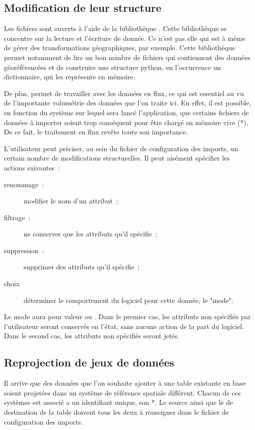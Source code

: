   \subsection{Modification de leur structure}

Les fichiers sont ouverts à l'aide de la bibliothèque . Cette bibliothèque se concentre sur la lecture et l'écriture de donnée. Ce n'est pas elle qui est à même de gérer des transformations géographiques, par exemple. Cette bibliothèque permet notamment de lire un bon nombre de fichiers qui contiennent des données géoréférencées et de construire une structure python, en l'occurrence un dictionnaire, qui les représente en mémoire.

De plus,  permet de travailler avec les données en flux, ce qui est essentiel au vu de l'importante volumétrie des données que l'on traite ici. En effet, il est possible, en fonction du système sur lequel sera lancé l'application, que certains fichiers de données à importer soient trop conséquent pour être chargé en mémoire vive (*). De ce fait, le traitement en flux revête toute son importance.

L'utilisateur peut préciser, au sein du fichier de configuration des imports, un certain nombre de modifications structurelles. Il peut aisément spécifier les actions suivantes~:

\begin{description}
  \item[renommage~:] modifier le nom d'un attribut~;
  \item[filtrage~:] ne conserver que les attributs qu'il spécifie~;
  \item[suppression~:] supprimer des attributs qu'il spécifie~;
  \item[choix] déterminer le comportement du logiciel pour cette donnée, le "mode".
\end{description}

Le mode aura pour valeur  ou . Dans le premier cas, les attributs non spécifiés par l'utilisateur seront conservés en l'état, sans aucune action de la part du logiciel. Dans le second cas, les attributs non spécifiés seront jetés.

  \subsection{Reprojection de jeux de données}

Il arrive que des données que l'on souhaite ajouter à une table existante en base soient projetées dans un système de référence spatiale différent. Chacun de ces systèmes est associé a un identifiant unique, son *. Le  source ainsi que le  de destination de la table doivent tous les deux à renseigner dans le fichier de configuration des imports.

